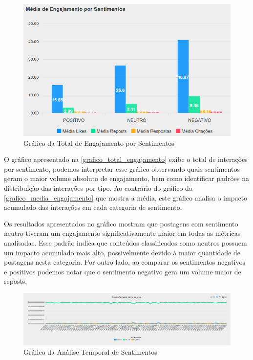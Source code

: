 \documentclass[
	12pt,				%
	oneside,			%
	a4paper,			%
	english,			%
	french,				%
	spanish,			%
	brazil				%
	]{abntex2}
\begin{document}
\begin{figure}[htbp]
\hypertarget{grafico_total_engajamento}{%
\caption{Gráfico da Total de Engajamento por Sentimentos}\label{grafico_total_engajamento}
\begin{center}
\includegraphics[scale=0.3]{imagens/sentilytics/estudo-caso/media_engajamento_por_sentimento.png}
\end{center}
}
\end{figure}

O gráfico apresentado na \autoref{grafico_total_engajamento} exibe o
total de interações por sentimento, podemos interpretar esse gráfico
observando quais sentimentos geram o maior volume absoluto de
engajamento, bem como identificar padrões na distribuição das interações
por tipo. Ao contrário do gráfico da \autoref{grafico_media_engajamento}
que mostra a média, este gráfico analisa o impacto acumulado das
interações em cada categoria de sentimento.

Os resultados apresentados no gráfico mostram que postagens com
sentimento neutro tiveram um engajamento significativamente maior em
todas as métricas analisadas. Esse padrão indica que conteúdos
classificados como neutros possuem um impacto acumulado mais alto,
possivelmente devido à maior quantidade de postagens nesta categoria.
Por outro lado, ao comparar os sentimentos negativos e positivos podemos
notar que o sentimento negativo gera um volume maior de reposts.

\begin{figure}[htbp]
\hypertarget{grafico_analise_temporal}{%
\caption{Gráfico da Análise Temporal de Sentimentos}\label{grafico_analise_temporal}
\begin{center}
\includegraphics[scale=0.26]{imagens/sentilytics/estudo-caso/analise_temporal_sentimentos.png}
\end{center}
}
\end{figure}
\end{document}
